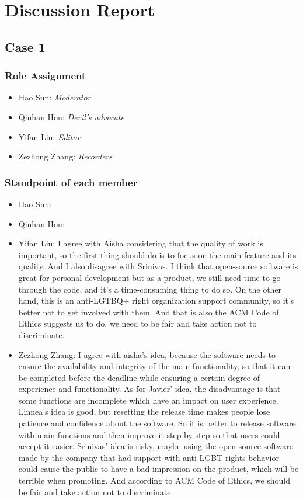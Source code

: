 \newpage
\section{Discussion Report}
	\subsection{Case 1}
		\subsubsection{Role Assignment}
		\begin{itemize}
  			\item Hao Sun: \emph{Moderator}
  			\item Qinhan Hou: \emph{Devil’s advocate}
  			\item Yifan Liu: \emph{Editor} 
  			\item Zezhong Zhang: \emph{Recorders}
		\end{itemize}
		\subsubsection{Standpoint of each member}
		\begin{itemize}
  			\item Hao Sun: 
  			\item Qinhan Hou:
  			\item Yifan Liu: I agree with Aisha considering that the quality of work is important, so the first thing should do is to focus on the main feature and its quality. And I also disagree with Srinivas. I think that open-source software is great for personal development but as a product, we still need time to go through the code, and it's a time-consuming thing to do so. On the other hand, this is an anti-LGTBQ+ right organization support community, so it's better not to get involved with them. 
  			And that is also the ACM Code of Ethics suggests us to do, we need to be fair and take action not to discriminate.
  			\item Zezhong Zhang: I agree with aisha's idea, because the software needs to ensure the availability and integrity of the main functionality, so that it can be completed before the deadline while ensuring a certain degree of experience and functionality. As for Javier' idea, the disadvantage is that some functions are incomplete which have an impact on user experience. Linnea's idea is good, but resetting the release time makes people lose patience and confidence about the software. So it is better to release software with main functions and then improve it step by step so that users could accept it easier. Srinivas' idea is risky, maybe using the open-source software made by the company that had support with anti-LGBT rights behavior could cause the public to have a bad impression on the product, which will be terrible when promoting. And according to ACM Code of Ethics, we should be fair and take action not to discriminate.
		\end{itemize}

